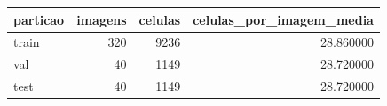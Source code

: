 \begin{tabular}{lrrr}
\toprule
particao & imagens & celulas & celulas_por_imagem_media \\
\midrule
train & 320 & 9236 & 28.860000 \\
val & 40 & 1149 & 28.720000 \\
test & 40 & 1149 & 28.720000 \\
\bottomrule
\end{tabular}
